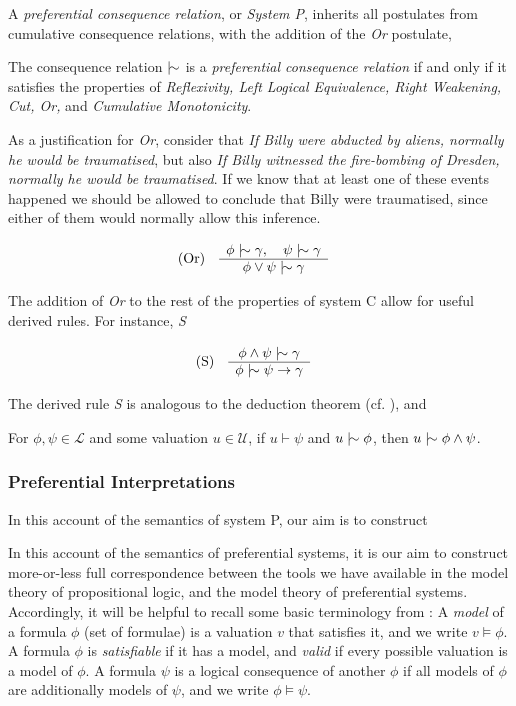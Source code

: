 A \textit{preferential consequence relation}, or \textit{System P}, inherits all postulates from cumulative consequence relations, with the addition
of the \textit{Or} postulate,

\begin{definition}
  \label{definition:preferential-relation} The consequence relation $\twiddle$ is a \emph{preferential consequence relation} if and only if
  it satisfies the properties of \emph{Reflexivity, Left Logical Equivalence, Right Weakening, Cut, Or,} and \emph{Cumulative Monotonicity}.
\end{definition}

As a justification for \textit{Or}, consider that \textit{If Billy were abducted by aliens, normally he would be traumatised}, but also \textit{If
Billy witnessed the fire-bombing of Dresden, normally he would be traumatised}. If we know that at least one of these events happened we should
be allowed to conclude that Billy were traumatised, since either of them would normally allow this inference.

\begin{align}
  \inferLeft{Or}{\phi \twiddle \gamma, \quad \psi \twiddle \gamma}{\phi \lor \psi \twiddle \gamma}
\end{align}

The addition of \textit{Or} to the rest of the properties of system C allow for useful derived rules. For instance, \textit{S}

\begin{align}
  \inferLeft{S}{\phi \land \psi \twiddle \gamma}{\phi \twiddle \psi \rightarrow \gamma}
\end{align}

The derived rule \textit{S} is analogous to the deduction theorem (cf. ), and

\begin{lemma}
  For $\phi, \psi \in \mathcal{L}$ and some valuation $u \in \mathcal{U}$, if $u \vdash \psi$ and $u \twiddle \phi$, then $u \twiddle \phi \land
  \psi$.
\end{lemma}

\subsubsection{Preferential Interpretations}

In this account of the semantics of system P, our aim is to construct

In this account of the semantics of preferential systems, it is our aim to construct more-or-less full correspondence between the tools we
have available in the model theory of propositional logic, and the model theory of preferential systems. Accordingly, it will be helpful to recall
some basic terminology from : A \textit{model} of a formula $\phi$ (set of formulae) is a valuation $v$ that
satisfies it, and we write $v \vDash \phi$. A formula $\phi$ is \textit{satisfiable} if it has a model, and \textit{valid} if every possible
valuation is a model of $\phi$. A formula $\psi$ is a logical consequence of another $\phi$ if all models of $\phi$ are additionally models of
$\psi$, and we write $\phi \vDash \psi$.

